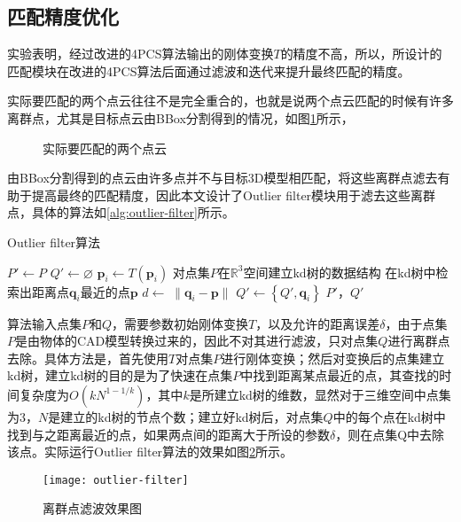 \subsection{匹配精度优化}
实验表明，经过改进的4PCS算法输出的刚体变换$T$的精度不高，所以，所设计的匹配模块在改进的4PCS算法后面通过滤波和迭代来提升最终匹配的精度。

实际要匹配的两个点云往往不是完全重合的，也就是说两个点云匹配的时候有许多离群点，尤其是目标点云由BBox分割得到的情况，如图\ref{fig:outlier-pointcloud}所示，
\begin{figure}[ht]
  \centering
  \hskip1cm
  \caption{实际要匹配的两个点云}
  \label{fig:outlier-pointcloud}
\end{figure}
由BBox分割得到的点云由许多点并不与目标3D模型相匹配，将这些离群点滤去有助于提高最终的匹配精度，因此本文设计了Outlier filter模块用于滤去这些离群点，具体的算法如\ref{alg:outlier-filter}所示。
\begin{algorithm}[ht]
  \caption{Outlier filter算法}
  \label{alg:outlier-filter}
  $P'\leftarrow P$\;
  $Q'\leftarrow \varnothing$\;
   {
    $\mathbf{p}_i\leftarrow T(\mathbf{p}_i)$\;
  }
  对点集$P$在$\mathbb{R}^3$空间建立kd树的数据结构\;
   {
    在kd树中检索出距离点$\mathbf{q}_i$最近的点$\mathbf{p}$\;
    $d\leftarrow\;\parallel\mathbf{q}_i-\mathbf{p}\parallel$\;
     {
      $Q'\leftarrow \left\{Q', \mathbf{q}_i\right\}$\;
    }
  }
  \Return $P'$，$Q'$\;
\end{algorithm}
算法输入点集$P$和$Q$，需要参数初始刚体变换$T$，以及允许的距离误差$\delta$，由于点集$P$是由物体的CAD模型转换过来的，因此不对其进行滤波，只对点集$Q$进行离群点去除。具体方法是，首先使用$T$对点集$P$进行刚体变换；然后对变换后的点集建立kd树，建立kd树的目的是为了快速在点集$P$中找到距离某点最近的点，其查找的时间复杂度为$O(kN^{1-1/k})$，其中$k$是所建立kd树的维数，显然对于三维空间中点集为3，$N$是建立的kd树的节点个数；建立好kd树后，对点集$Q$中的每个点在kd树中找到与之距离最近的点，如果两点间的距离大于所设的参数$\delta$，则在点集Q中去除该点。实际运行Outlier filter算法的效果如图\ref{fig:outlier-filter}所示。
\begin{figure}[ht]
  \centering
  \texttt{[image: outlier-filter]}
  \caption{离群点滤波效果图}
  \label{fig:outlier-filter}
\end{figure}

